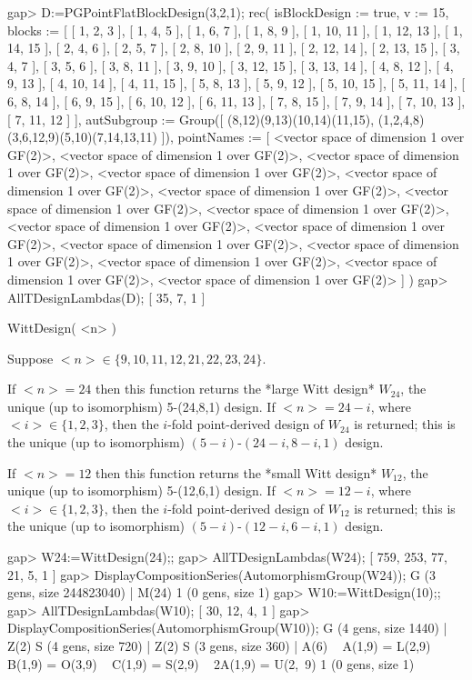 \beginexample
gap> D:=PGPointFlatBlockDesign(3,2,1);
rec( isBlockDesign := true, v := 15, 
  blocks := [ [ 1, 2, 3 ], [ 1, 4, 5 ], [ 1, 6, 7 ], [ 1, 8, 9 ], 
      [ 1, 10, 11 ], [ 1, 12, 13 ], [ 1, 14, 15 ], [ 2, 4, 6 ], [ 2, 5, 7 ], 
      [ 2, 8, 10 ], [ 2, 9, 11 ], [ 2, 12, 14 ], [ 2, 13, 15 ], [ 3, 4, 7 ], 
      [ 3, 5, 6 ], [ 3, 8, 11 ], [ 3, 9, 10 ], [ 3, 12, 15 ], [ 3, 13, 14 ], 
      [ 4, 8, 12 ], [ 4, 9, 13 ], [ 4, 10, 14 ], [ 4, 11, 15 ], [ 5, 8, 13 ], 
      [ 5, 9, 12 ], [ 5, 10, 15 ], [ 5, 11, 14 ], [ 6, 8, 14 ], [ 6, 9, 15 ], 
      [ 6, 10, 12 ], [ 6, 11, 13 ], [ 7, 8, 15 ], [ 7, 9, 14 ], 
      [ 7, 10, 13 ], [ 7, 11, 12 ] ], 
  autSubgroup := Group([ (8,12)(9,13)(10,14)(11,15), 
      (1,2,4,8)(3,6,12,9)(5,10)(7,14,13,11) ]), 
  pointNames := [ <vector space of dimension 1 over GF(2)>, 
      <vector space of dimension 1 over GF(2)>, 
      <vector space of dimension 1 over GF(2)>, 
      <vector space of dimension 1 over GF(2)>, 
      <vector space of dimension 1 over GF(2)>, 
      <vector space of dimension 1 over GF(2)>, 
      <vector space of dimension 1 over GF(2)>, 
      <vector space of dimension 1 over GF(2)>, 
      <vector space of dimension 1 over GF(2)>, 
      <vector space of dimension 1 over GF(2)>, 
      <vector space of dimension 1 over GF(2)>, 
      <vector space of dimension 1 over GF(2)>, 
      <vector space of dimension 1 over GF(2)>, 
      <vector space of dimension 1 over GF(2)>, 
      <vector space of dimension 1 over GF(2)> ] )
gap> AllTDesignLambdas(D);
[ 35, 7, 1 ]
\endexample



\>WittDesign( <n> )

Suppose $<n>\in \{9,10,11,12,21,22,23,24\}$. 

If $<n>=24$ then this function returns the *large Witt design* $W_{24}$,
the unique (up to isomorphism) 5-(24,8,1) design. If $<n>=24-i$, where
$<i>\in \{1,2,3\}$, then the $i$-fold point-derived design of $W_{24}$
is returned; this is the unique (up to isomorphism) $(5-i)$-$(24-i,8-i,1)$
design.

If $<n>=12$ then this function returns the *small Witt design* $W_{12}$,
the unique (up to isomorphism) 5-(12,6,1) design. If $<n>=12-i$, where
$<i>\in \{1,2,3\}$, then the $i$-fold point-derived design of $W_{12}$
is returned; this is the unique (up to isomorphism) $(5-i)$-$(12-i,6-i,1)$
design.

\beginexample
gap> W24:=WittDesign(24);;
gap> AllTDesignLambdas(W24);
[ 759, 253, 77, 21, 5, 1 ]
gap> DisplayCompositionSeries(AutomorphismGroup(W24));
G (3 gens, size 244823040)
 | M(24)
1 (0 gens, size 1)
gap> W10:=WittDesign(10);;
gap> AllTDesignLambdas(W10);
[ 30, 12, 4, 1 ]
gap> DisplayCompositionSeries(AutomorphismGroup(W10));
G (4 gens, size 1440)
 | Z(2)
S (4 gens, size 720)
 | Z(2)
S (3 gens, size 360)
 | A(6) ~ A(1,9) = L(2,9) ~ B(1,9) = O(3,9) ~ C(1,9) = S(2,9) ~ 2A(1,9) = U(2,\
9)
1 (0 gens, size 1)
\endexample



